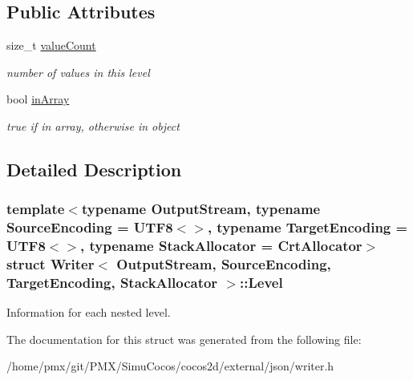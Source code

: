 \subsection*{Public Attributes}
\begin{DoxyCompactItemize}
\item 
\mbox{\label{structWriter_1_1Level_a01214721e4001d997f3057d26edba9a0}} 
size\+\_\+t \hyperlink{structWriter_1_1Level_a01214721e4001d997f3057d26edba9a0}{value\+Count}
\begin{DoxyCompactList}\small\item\em number of values in this level \end{DoxyCompactList}\item 
\mbox{\label{structWriter_1_1Level_aa188a24842bcadebcd037ab852b978bb}} 
bool \hyperlink{structWriter_1_1Level_aa188a24842bcadebcd037ab852b978bb}{in\+Array}
\begin{DoxyCompactList}\small\item\em true if in array, otherwise in object \end{DoxyCompactList}\end{DoxyCompactItemize}


\subsection{Detailed Description}
\subsubsection*{template$<$typename Output\+Stream, typename Source\+Encoding = U\+T\+F8$<$$>$, typename Target\+Encoding = U\+T\+F8$<$$>$, typename Stack\+Allocator = Crt\+Allocator$>$\newline
struct Writer$<$ Output\+Stream, Source\+Encoding, Target\+Encoding, Stack\+Allocator $>$\+::\+Level}

Information for each nested level. 

The documentation for this struct was generated from the following file\+:\begin{DoxyCompactItemize}
\item 
/home/pmx/git/\+P\+M\+X/\+Simu\+Cocos/cocos2d/external/json/writer.\+h\end{DoxyCompactItemize}
